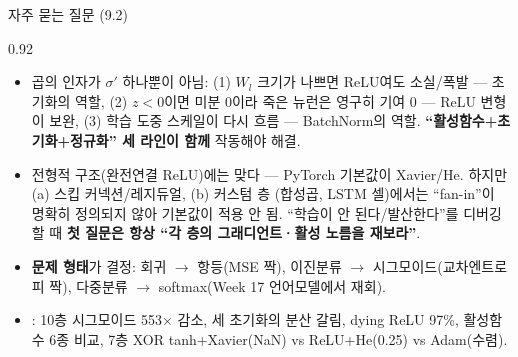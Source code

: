 \begin{frame}{자주 묻는 질문 (9.2)}
\begin{center}\begin{varwidth}{0.92\textwidth}
  \small
  \begin{itemize}
    \item {}
      곱의 인자가 $\sigma'$ 하나뿐이 아님: (1) $W_l$ 크기가 나쁘면
      ReLU여도 소실/폭발 — 초기화의 역할, (2) $z<0$이면 미분 0이라
      죽은 뉴런은 영구히 기여 0 — ReLU 변형이 보완, (3) 학습 도중
      스케일이 다시 흐름 — BatchNorm의 역할.
      \textbf{``활성함수+초기화+정규화'' 세 라인이 함께} 작동해야
      해결.
    \item {}
      전형적 구조(완전연결 ReLU)에는 맞다 — PyTorch 기본값이
      Xavier/He. 하지만 (a) 스킵 커넥션/레지듀얼, (b) 커스텀 층
      (합성곱, LSTM 셀)에서는 ``fan-in''이 명확히 정의되지 않아
      기본값이 적용 안 됨. ``학습이 안 된다/발산한다''를 디버깅할
      때 \textbf{첫 질문은 항상 ``각 층의 그래디언트·활성 노름을
      재보라''}.
    \item {} \textbf{문제 형태}가 결정:
      회귀 $\to$ 항등(MSE 짝), 이진분류 $\to$ 시그모이드(교차엔트로피
      짝), 다중분류 $\to$ softmax(Week 17 언어모델에서 재회).
    \item {}: 10층 시그모이드 553$\times$ 감소, 세 초기화의
      분산 갈림, dying ReLU 97\%, 활성함수 6종 비교, 7층 XOR
      tanh+Xavier(NaN) vs ReLU+He(0.25) vs Adam(수렴).
  \end{itemize}
\end{varwidth}\end{center}
\end{frame}
